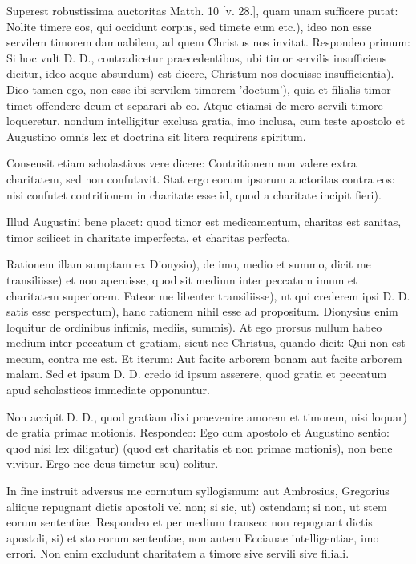 Superest robustissima auctoritas Matth. 10 [v. 28.], quam unam sufficere putat: Nolite timere eos, qui occidunt corpus, sed timete eum etc.), ideo non esse servilem timorem damnabilem, ad quem Christus nos invitat. Respondeo primum: Si hoc vult D. D., contradicetur praecedentibus, ubi timor servilis insufficiens dicitur, ideo aeque absurdum) est dicere, Christum nos docuisse insufficientia). Dico tamen ego, non esse ibi servilem timorem 'doctum'), quia et filialis timor timet offendere deum et separari ab eo. Atque etiamsi de mero servili timore loqueretur, nondum intelligitur exclusa gratia, imo inclusa, cum teste apostolo et Augustino omnis lex et doctrina sit litera requirens spiritum.

Consensit etiam scholasticos vere dicere: Contritionem non valere extra charitatem, sed non confutavit. Stat ergo eorum ipsorum auctoritas contra eos: nisi confutet contritionem in charitate esse id, quod a charitate incipit fieri).

Illud Augustini bene placet: quod timor est medicamentum, charitas est sanitas, timor scilicet in charitate imperfecta, et charitas perfecta.

Rationem illam sumptam ex Dionysio), de imo, medio et summo, dicit me transiliisse) et non aperuisse, quod sit medium inter peccatum imum et charitatem superiorem. Fateor me libenter transiliisse), ut qui crederem ipsi D. D. satis esse perspectum), hanc rationem nihil esse ad propositum. Dionysius enim loquitur de ordinibus infimis, mediis, summis). At ego prorsus nullum habeo medium inter peccatum et gratiam, sicut nec Christus, quando dicit: Qui non est mecum, contra me est. Et iterum: Aut facite arborem bonam aut facite arborem malam. Sed et ipsum D. D. credo id ipsum asserere, quod gratia et peccatum apud scholasticos immediate opponuntur.

Non accipit D. D., quod gratiam dixi praevenire amorem et timorem, nisi loquar) de gratia primae motionis. Respondeo: Ego cum apostolo et Augustino sentio: quod nisi lex diligatur) (quod est charitatis et non primae motionis), non bene vivitur. Ergo nec deus timetur seu) colitur.

\marginpar{\small[372]} In fine instruit adversus me cornutum syllogismum: aut Ambrosius, Gregorius aliique repugnant dictis apostoli vel non; si sic, ut) ostendam; si non, ut stem eorum sententiae. Respondeo et per medium transeo: non repugnant dictis apostoli, si) et sto eorum sententiae, non autem Eccianae intelligentiae, imo errori. Non enim excludunt charitatem a timore sive servili sive filiali.


